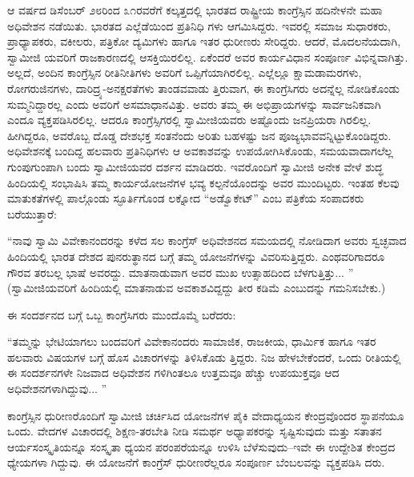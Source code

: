 ಆ ವರ್ಷದ ಡಿಸೆಂಬರ್ ೨೮ರಿಂದ ೩೧ರವರೆಗೆ ಕಲ್ಕತ್ತದಲ್ಲಿ ಭಾರತದ ರಾಷ್ಟ್ರೀಯ ಕಾಂಗ್ರೆಸ್ಸಿನ ಹದಿನೇಳನೇ ಮಹಾ ಅಧಿವೇಶನ ನಡೆಯಿತು. ಭಾರತದ ಎಲ್ಲೆಡೆಯಿಂದ ಪ್ರತಿನಿಧಿ ಗಳು ಆಗಮಿಸಿದ್ದರು. ಇವರಲ್ಲಿ ಸಮಾಜ ಸುಧಾರಕರು, ಪ್ರಾಧ್ಯಾಪಕರು, ವಕೀಲರು, ಪತ್ರಿಕೋ ದ್ಯಮಿಗಳು ಹಾಗೂ ಇತರ ಧುರೀಣರು ಸೇರಿದ್ದರು. ಆದರೆ, ಮೊದಲನೆಯದಾಗಿ, ಸ್ವಾಮೀಜಿ ಯವರಿಗೆ ರಾಜಕಾರಣದಲ್ಲಿ ಆಸಕ್ತಿಯಿರಲಿಲ್ಲ. ಏಕೆಂದರೆ ಅವರ ಕಾರ್ಯವಿಧಾನ ಸಂಪೂರ್ಣ ವಿಭಿನ್ನವಾಗಿತ್ತು. ಅಲ್ಲದೆ, ಅಂದಿನ ಕಾಂಗ್ರೆಸ್ಸಿನ ರೀತಿನೀತಿಗಳು ಅವರಿಗೆ ಒಪ್ಪಿಗೆಯಾಗಿರಲಿಲ್ಲ. ಎಲ್ಲೆಲ್ಲೂ ಕ್ಷಾಮಡಾಮರಗಳು, ರೋಗರುಜಿನಗಳು, ದಾರಿದ್ರ್ಯ-ಅನಕ್ಷರತೆಗಳು ತಾಂಡವವಾಡು ತ್ತಿರುವಾಗ, ಈ ಕಾಂಗ್ರೆಸಿಗರು ಅದನ್ನೆಲ್ಲ ನೋಡಿಕೊಂಡು ಸುಮ್ಮನಿದ್ದಾರಲ್ಲ ಎಂದು ಅವರಿಗೆ ಅಸಮಾಧಾನವಿತ್ತು. ಅವರು ತಮ್ಮ ಈ ಅಭಿಪ್ರಾಯಗಳನ್ನು ಸಾರ್ವಜನಿಕವಾಗಿ ಎಂದೂ ವ್ಯಕ್ತಪಡಿಸಿರಲಿಲ್ಲ. ಆದರೂ ಕಾಂಗ್ರೆಸ್ಸಿಗರಲ್ಲಿ ಸ್ವಾಮೀಜಿಯವರು ಅಷ್ಟೊಂದು ಜನಪ್ರಿಯರಾ ಗಿರಲಿಲ್ಲ. ಹೀಗಿದ್ದರೂ, ಅವರೊಬ್ಬ ದೊಡ್ಡ ದೇಶಭಕ್ತ ಸಂತನೆಂದು ಅರಿತು ಬಹಳಷ್ಟು ಜನ ಪೂಜ್ಯಭಾವವನ್ನಿಟ್ಟುಕೊಂಡಿದ್ದರು. ಅಧಿವೇಶನಕ್ಕೆ ಬಂದಿದ್ದ ಹಲವಾರು ಪ್ರತಿನಿಧಿಗಳು ಆ ಅವಕಾಶವನ್ನು ಉಪಯೋಗಿಸಿಕೊಂಡು, ಸಮಯವಾದಾಗಲೆಲ್ಲ ಗುಂಪುಗುಂಪಾಗಿ ಬಂದು ಸ್ವಾಮೀಜಿಯವರ ದರ್ಶನ ಮಾಡಿದರು. ಇವರೊಂದಿಗೆ ಸ್ವಾಮೀಜಿ ಅನೇಕ ವೇಳೆ ಶುದ್ಧ ಹಿಂದಿಯಲ್ಲಿ ಸಂಭಾಷಿಸಿ ತಮ್ಮ ಕಾರ್ಯಯೋಜನೆಗಳ ಭವ್ಯ ಕಲ್ಪನೆಯೊಂದನ್ನು ಅವರ ಮುಂದಿಟ್ಟರು. ಇಂತಹ ಕೆಲವು ಮಾತುಕತೆಗಳಲ್ಲಿ ಪಾಲ್ಗೊಂಡು ಸ್ಫೂರ್ತಿಗೊಂಡ ಲಕ್ನೋದ “ಅಡ್ವೊಕೇಟ್​” ಎಂಬ ಪತ್ರಿಕೆಯ ಸಂಪಾದಕರು ಬರೆಯುತ್ತಾರೆ:

“ನಾವು ಸ್ವಾಮಿ ವಿವೇಕಾನಂದರನ್ನು ಕಳೆದ ಸಲ ಕಾಂಗ್ರೆಸ್ ಅಧಿವೇಶನದ ಸಮಯದಲ್ಲಿ ನೋಡಿದಾಗ ಅವರು ಸ್ವಚ್ಛವಾದ ಹಿಂದಿಯಲ್ಲಿ ಭಾರತ ದೇಶದ ಪುನರುತ್ಥಾನದ ಬಗ್ಗೆ ತಮ್ಮ ಯೋಜನೆಗಳನ್ನು ವಿವರಿಸುತ್ತಿದ್ದರು. ಎಂಥವರಿಗಾದರೂ ಗೌರವ ತರಬಲ್ಲ ಭಾಷೆ ಅವರದ್ದು. ಮಾತನಾಡುವಾಗ ಅವರ ಮುಖ ಉತ್ಸಾಹದಿಂದ ಬೆಳಗುತ್ತಿತ್ತು... ” (ಸ್ವಾಮೀಜಿಯವರಿಗೆ ಹಿಂದಿಯಲ್ಲಿ ಮಾತನಾಡುವ ಅವಕಾಶವಿದ್ದದ್ದು ತೀರ ಕಡಿಮೆ ಎಂಬುದನ್ನು ಗಮನಿಸಬೇಕು.)

ಈ ಸಂದರ್ಶನದ ಬಗ್ಗೆ ಒಬ್ಬ ಕಾಂಗ್ರೆಸಿಗರು ಮುಂದೊಮ್ಮೆ ಬರೆದರು:

“ತಮ್ಮನ್ನು ಭೇಟಿಯಾಗಲು ಬಂದವರಿಗೆ ವಿವೇಕಾನಂದರು ಸಾಮಾಜಿಕ, ರಾಜಕೀಯ, ಧಾರ್ಮಿಕ ಹಾಗೂ ಇತರ ಹಲವಾರು ವಿಷಯಗಳ ಬಗ್ಗೆ ಹೊಸ ವಿಚಾರಗಳನ್ನು ತಿಳಿಸಿಕೊಡು ತ್ತಿದ್ದರು. ನಿಜ ಹೇಳಬೇಕೆಂದರೆ, ಒಂದು ರೀತಿಯಲ್ಲಿ ಈ ಸಂದರ್ಶನಗಳೇ ನಿಜವಾದ ಅಧಿವೇಶನ ಗಳಿಗಿಂತಲೂ ಉತ್ತಮವೂ ಹೆಚ್ಚು ಉಪಯುಕ್ತವೂ ಆದ ಅಧಿವೇಶನಗಳಾಗಿದ್ದುವು... ”

ಕಾಂಗ್ರೆಸ್ಸಿನ ಧುರೀಣರೊಂದಿಗೆ ಸ್ವಾಮೀಜಿ ಚರ್ಚಿಸಿದ ಯೋಜನೆಗಳ ಪೈಕಿ ವೇದಾಧ್ಯಯನ ಕೇಂದ್ರವೊಂದರ ಸ್ಥಾಪನೆಯೂ ಒಂದು. ವೇದಗಳ ವಿಚಾರದಲ್ಲಿ ಶಿಕ್ಷಣ-ತರಬೇತಿ ನೀಡಿ ಸಮರ್ಥ ಅಧ್ಯಾಪಕರನ್ನು ಸೃಷ್ಟಿಸುವುದು ಮತ್ತು ಸತಾತನ ಆರ್ಯಸಂಸ್ಕೃತಿಯನ್ನೂ ಸಂಸ್ಕೃತಾ ಧ್ಯಯನ ಪರಂಪರೆಯನ್ನೂ ಉಳಿಸಿ ಬೆಳೆಸುವುದು–ಇವೇ ಈ ಉದ್ದೇಶಿತ ಕೇಂದ್ರದ ಧ್ಯೇಯಗಳಾ ಗಿದ್ದುವು. ಈ ಯೋಜನೆಗೆ ಕಾಂಗ್ರೆಸ್ ಧುರೀಣರೆಲ್ಲರೂ ಸಂಪೂರ್ಣ ಬೆಂಬಲವನ್ನು ವ್ಯಕ್ತಪಡಿಸಿ ದರು.

